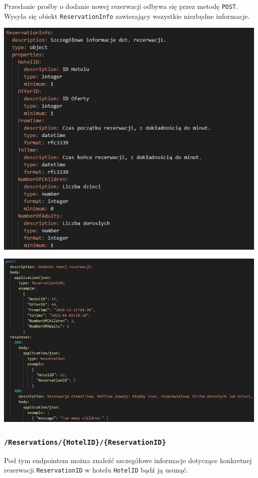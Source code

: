 \documentclass{article}
\begin{document}
Przesłanie prośby o dodanie nowej rezerwacji odbywa się przez metodę \texttt{POST}. Wysyła się obiekt \texttt{ReservationInfo} zawierający wszystkie niezbędne informacje.

\includegraphics[width=\linewidth]{Rezerwacje/reservationInfoType.jpg}

\includegraphics[scale=0.6]{Rezerwacje/reservationsPOST.jpg}

\subsubsection{\texttt{/Reservations/\{HotelID\}/\{ReservationID\}}}
Pod tym endpointem można znaleźć szczegółowe informacje dotyczące konkretnej rezerwacji \texttt{ReservationID} w hotelu \texttt{HotelID} bądź ją usunąć.
\end{document}
